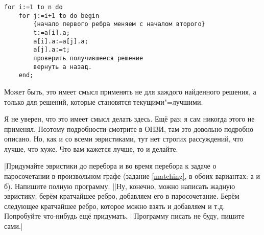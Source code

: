 \begin{codesampleo}\begin{verbatim}
for i:=1 to n do
    for j:=i+1 to do begin
        {начало первого ребра меняем с началом второго}
        t:=a[i].a; 
        a[i].a:=a[j].a;
        a[j].a:=t;
        проверить получившееся решение
        вернуть a назад.
    end;
\end{verbatim}
\end{codesampleo}
Может быть, это имеет смысл применять не для каждого найденного решения, а только для решений, которые становятся текущими"=лучшими.

Я не уверен, что это имеет смысл делать здесь. Ещё раз: я сам никогда этого не применял. 
Поэтому подробности смотрите в ОНЗИ, там это довольно подробно описано. Но, как и со всеми эвристиками, тут нет строгих рассуждений, что лучше, что хуже. Что вам кажется лучше, то и делайте.


\task|Придумайте эвристики до перебора и во время перебора к задаче о паросочетании в
произвольном графе (задание \ref{matching}, в обоих вариантах: а и б). Напишите 
полную программу.
||Ну, конечно, можно написать жадную эвристику: берём кратчайшее ребро, добавляем его в 
паросочетание. Берём следующее кратчайшее ребро, которое можно взять и 
добавляем и т.д. Попробуйте что-нибудь ещё придумать.
||Программу писать не буду, пишите сами.|
